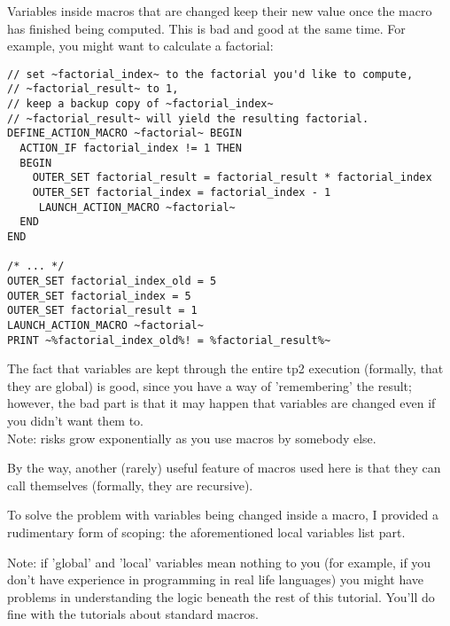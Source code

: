 \documentclass{article}
\begin{document}
Variables inside macros that are changed keep their new value once the
macro has finished being computed. This is bad and good at the same time.
For example, you might want to calculate a factorial:
\begin{verbatim}
// set ~factorial_index~ to the factorial you'd like to compute,
// ~factorial_result~ to 1,
// keep a backup copy of ~factorial_index~
// ~factorial_result~ will yield the resulting factorial.
DEFINE_ACTION_MACRO ~factorial~ BEGIN
  ACTION_IF factorial_index != 1 THEN
  BEGIN
    OUTER_SET factorial_result = factorial_result * factorial_index
    OUTER_SET factorial_index = factorial_index - 1
     LAUNCH_ACTION_MACRO ~factorial~
  END
END

/* ... */
OUTER_SET factorial_index_old = 5
OUTER_SET factorial_index = 5
OUTER_SET factorial_result = 1
LAUNCH_ACTION_MACRO ~factorial~
PRINT ~%factorial_index_old%! = %factorial_result%~
\end{verbatim}
The fact that variables are kept through the entire tp2 execution (formally,
that they are global) is good, since you have a way of 'remembering' the result;
however, the bad part is that it may happen that variables are changed even if you
didn't want them to.\\
Note: risks grow exponentially as you use macros by somebody else.

By the way, another (rarely) useful feature of macros used here is that they
can call themselves (formally, they are recursive).

To solve the problem with variables being changed inside a macro, I provided
a rudimentary form of scoping: the aforementioned local variables list part.

Note: if 'global' and 'local' variables mean nothing to you (for example, if you
don't have experience in programming in real life languages) you might have
problems in understanding the logic beneath the rest of this tutorial. You'll do
fine with the tutorials about standard macros.
\end{document}
